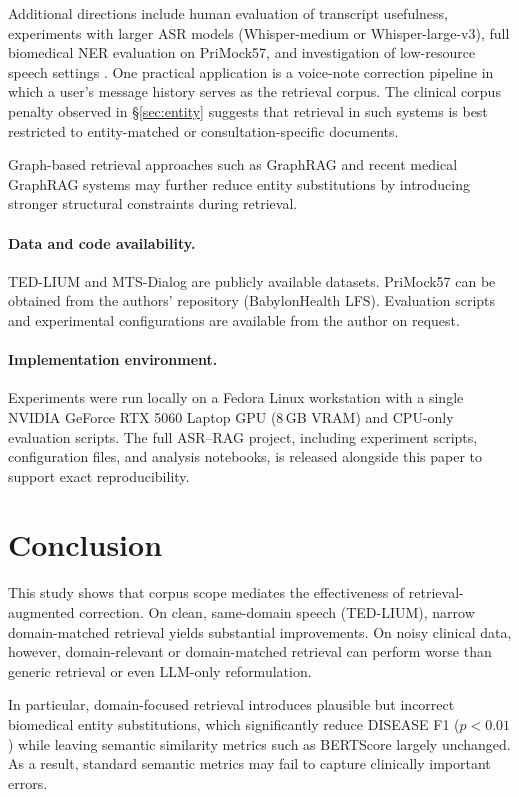 \documentclass[11pt,a4paper,twocolumn]{article}
\begin{document}
Additional directions include human evaluation of transcript usefulness,
experiments with larger ASR models (Whisper-medium or Whisper-large-v3), full
biomedical NER evaluation on PriMock57, and investigation of low-resource
speech settings \cite{lonergan2022}. One practical application is a
voice-note correction pipeline in which a user's message history serves as the
retrieval corpus. The clinical corpus penalty observed in \S\ref{sec:entity}
suggests that retrieval in such systems is best restricted to
entity-matched or consultation-specific documents.

Graph-based retrieval approaches such as GraphRAG \cite{edge2024graphrag} and
recent medical GraphRAG systems
\cite{wu2025medgraphrag,zhao2025medrag,kim2026medsumgraph,zhang2025cmedragbot}
may further reduce entity substitutions by introducing stronger structural
constraints during retrieval.

\paragraph{Data and code availability.} TED-LIUM and MTS-Dialog are publicly
available datasets. PriMock57 can be obtained from the authors' repository
(BabylonHealth LFS). Evaluation scripts and experimental configurations are
available from the author on request.

\paragraph{Implementation environment.}
Experiments were run locally on a Fedora Linux workstation with a single
NVIDIA GeForce RTX 5060 Laptop GPU (8\,GB VRAM) and CPU-only evaluation
scripts. The full ASR--RAG project, including experiment scripts,
configuration files, and analysis notebooks, is released alongside this paper
to support exact reproducibility.

\section{Conclusion}

This study shows that corpus scope mediates the effectiveness of
retrieval-augmented correction. On clean, same-domain speech (TED-LIUM),
narrow domain-matched retrieval yields substantial improvements. On noisy
clinical data, however, domain-relevant or domain-matched retrieval can
perform worse than generic retrieval or even LLM-only reformulation.

In particular, domain-focused retrieval introduces plausible but incorrect
biomedical entity substitutions, which significantly reduce DISEASE F1
($p < 0.01$) while leaving semantic similarity metrics such as BERTScore
largely unchanged. As a result, standard semantic metrics may fail to capture
clinically important errors.
\end{document}
